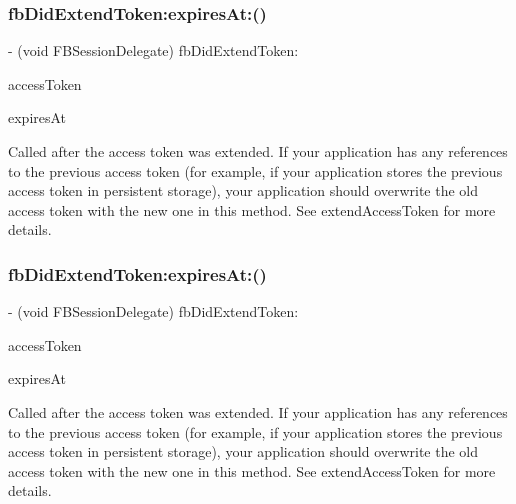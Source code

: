 \subsubsection{\texorpdfstring{fb\+Did\+Extend\+Token\+:expires\+At\+:()}{fbDidExtendToken:expiresAt:()}\hspace{0.1cm}{\footnotesize\ttfamily [1/2]}}
{\footnotesize\ttfamily -\/ (void F\+B\+Session\+Delegate) fb\+Did\+Extend\+Token\+: \begin{DoxyParamCaption}\item[{(N\+S\+String $\ast$)}]{access\+Token }\item[{expiresAt:(N\+S\+Date $\ast$)}]{expires\+At }\end{DoxyParamCaption}}

Called after the access token was extended. If your application has any references to the previous access token (for example, if your application stores the previous access token in persistent storage), your application should overwrite the old access token with the new one in this method. See extend\+Access\+Token for more details. \mbox{\label{protocolFBSessionDelegate_01-p_a9b11d87747c5e472cf95c58d45a85f9c}} 
\subsubsection{\texorpdfstring{fb\+Did\+Extend\+Token\+:expires\+At\+:()}{fbDidExtendToken:expiresAt:()}\hspace{0.1cm}{\footnotesize\ttfamily [2/2]}}
{\footnotesize\ttfamily -\/ (void F\+B\+Session\+Delegate) fb\+Did\+Extend\+Token\+: \begin{DoxyParamCaption}\item[{(N\+S\+String $\ast$)}]{access\+Token }\item[{expiresAt:(N\+S\+Date $\ast$)}]{expires\+At }\end{DoxyParamCaption}}

Called after the access token was extended. If your application has any references to the previous access token (for example, if your application stores the previous access token in persistent storage), your application should overwrite the old access token with the new one in this method. See extend\+Access\+Token for more details. \mbox{\label{protocolFBSessionDelegate_01-p_a18bb57139baaf9fe0814a573af4b7a98}} 
